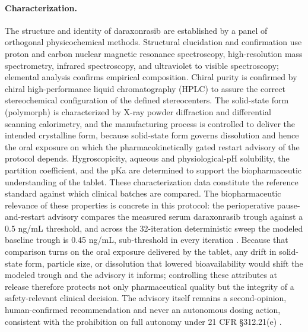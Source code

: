 \paragraph{Characterization.}
The structure and identity of daraxonrasib are established by a panel of
orthogonal physicochemical methods. Structural elucidation and confirmation use
proton and carbon nuclear magnetic resonance spectroscopy, high-resolution mass
spectrometry, infrared spectroscopy, and ultraviolet to visible spectroscopy;
elemental analysis confirms empirical composition. Chiral purity is confirmed by
chiral high-performance liquid chromatography (HPLC) to assure the correct
stereochemical configuration of the defined stereocenters. The solid-state form
(polymorph) is characterized by X-ray powder diffraction and differential
scanning calorimetry, and the manufacturing process is controlled to deliver the
intended crystalline form, because solid-state form governs dissolution and
hence the oral exposure on which the pharmacokinetically gated restart advisory
of the protocol depends. Hygroscopicity, aqueous and physiological-pH
solubility, the partition coefficient, and the pKa are determined to support the
biopharmaceutic understanding of the tablet. These characterization data
constitute the reference standard against which clinical batches are compared.
The biopharmaceutic relevance of these properties is concrete in this protocol:
the perioperative pause-and-restart advisory compares the measured serum
daraxonrasib trough against a 0.5 ng/mL threshold, and across the 32-iteration
deterministic sweep the modeled baseline trough is 0.45 ng/mL, sub-threshold in
every iteration \cite{daraxwhipple}. Because that comparison turns on the oral
exposure delivered by the tablet, any drift in solid-state form, particle size,
or dissolution that lowered bioavailability would shift the modeled trough and
the advisory it informs; controlling these attributes at release therefore
protects not only pharmaceutical quality but the integrity of a safety-relevant
clinical decision. The advisory itself remains a second-opinion, human-confirmed
recommendation and never an autonomous dosing action, consistent with the
prohibition on full autonomy under 21 CFR \S 312.21(e) \cite{onpremwhippl}.

